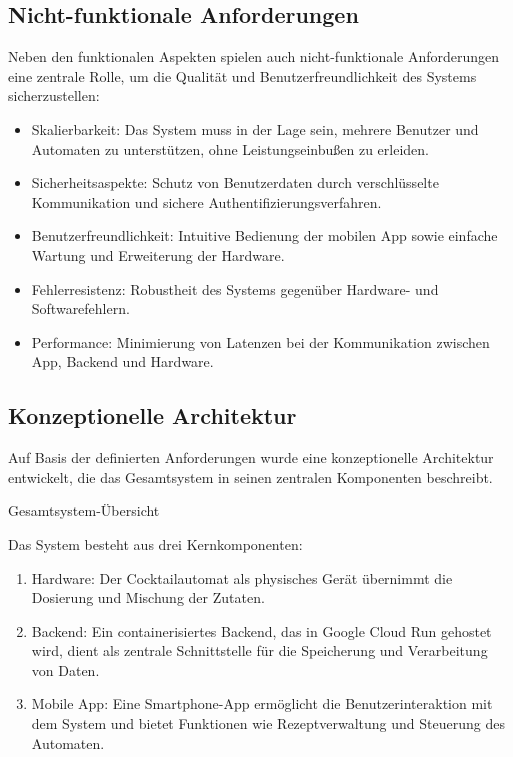 \subsection{Nicht-funktionale Anforderungen}

Neben den funktionalen Aspekten spielen auch nicht-funktionale Anforderungen eine zentrale Rolle, um die Qualität und Benutzerfreundlichkeit des Systems sicherzustellen:

\begin{itemize}
	  \item	Skalierbarkeit: Das System muss in der Lage sein, mehrere Benutzer und Automaten zu unterstützen, ohne Leistungseinbußen zu erleiden.
	  \item	Sicherheitsaspekte: Schutz von Benutzerdaten durch verschlüsselte Kommunikation und sichere Authentifizierungsverfahren.
	  \item	Benutzerfreundlichkeit: Intuitive Bedienung der mobilen App sowie einfache Wartung und Erweiterung der Hardware.
	  \item	Fehlerresistenz: Robustheit des Systems gegenüber Hardware- und Softwarefehlern.
	  \item	Performance: Minimierung von Latenzen bei der Kommunikation zwischen App, Backend und Hardware.
\end{itemize}

\subsection{Konzeptionelle Architektur}

Auf Basis der definierten Anforderungen wurde eine konzeptionelle Architektur entwickelt, die das Gesamtsystem in seinen zentralen Komponenten beschreibt.

Gesamtsystem-Übersicht

Das System besteht aus drei Kernkomponenten:

\begin{enumerate}
  \item Hardware: Der Cocktailautomat als physisches Gerät übernimmt die Dosierung und Mischung der Zutaten.
  \item Backend: Ein containerisiertes Backend, das in Google Cloud Run gehostet wird, dient als zentrale Schnittstelle für die Speicherung und Verarbeitung von Daten.
  \item Mobile App: Eine Smartphone-App ermöglicht die Benutzerinteraktion mit dem System und bietet Funktionen wie Rezeptverwaltung und Steuerung des Automaten.
\end{enumerate}

